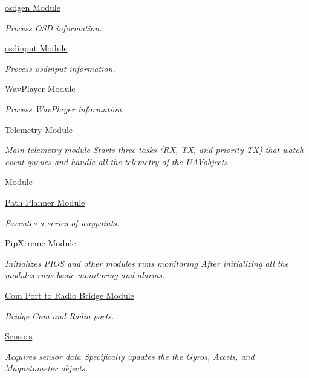 \begin{DoxyCompactItemize}
\hyperlink{group___o_s_d_g_e_n_module}{osdgen Module}
\begin{DoxyCompactList}\small\item\em Process O\-S\-D information. \end{DoxyCompactList}\item 
\hyperlink{group__osdinput_module}{osdinput Module}
\begin{DoxyCompactList}\small\item\em Process osdinput information. \end{DoxyCompactList}\item 
\hyperlink{group___wav_player_module}{Wav\-Player Module}
\begin{DoxyCompactList}\small\item\em Process Wav\-Player information. \end{DoxyCompactList}\item 
\hyperlink{group___telemetry_module}{Telemetry Module}
\begin{DoxyCompactList}\small\item\em Main telemetry module Starts three tasks (R\-X, T\-X, and priority T\-X) that watch event queues and handle all the telemetry of the U\-A\-Vobjects. \end{DoxyCompactList}\item 
\hyperlink{group___path_follower}{Module}
\item 
\hyperlink{group___path_planner}{Path Planner Module}
\begin{DoxyCompactList}\small\item\em Executes a series of waypoints. \end{DoxyCompactList}\item 
\hyperlink{group___pip_xtreme_module}{Pip\-Xtreme Module}
\begin{DoxyCompactList}\small\item\em Initializes P\-I\-O\-S and other modules runs monitoring After initializing all the modules runs basic monitoring and alarms. \end{DoxyCompactList}\item 
\hyperlink{group___radio_com_bridge_module}{Com Port to Radio Bridge Module}
\begin{DoxyCompactList}\small\item\em Bridge Com and Radio ports. \end{DoxyCompactList}\item 
\hyperlink{group___sensors}{Sensors}
\begin{DoxyCompactList}\small\item\em Acquires sensor data Specifically updates the the Gyros, Accels, and Magnetometer objects. \end{DoxyCompactList}\item 

\end{DoxyCompactItemize}
